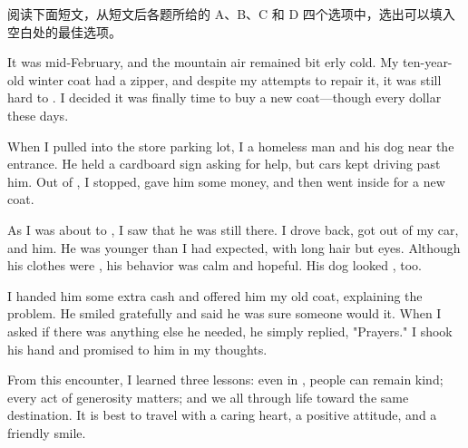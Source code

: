 \documentclass{英语试卷}
\begin{document}
\par 阅读下面短文，从短文后各题所给的 A、B、C 和 D 四个选项中，选出可以填入空白处的最佳选项。\par
\par It was mid-February, and the mountain air remained bit erly cold. My ten-year-old winter coat had a  zipper, and despite my attempts to repair it, it was still hard to . I decided it was finally time to buy a new coat—though every dollar  these days.\par
\par When I pulled into the store parking lot, I  a homeless man and his dog near the entrance. He held a cardboard sign asking for help, but cars kept driving past him. Out of , I stopped, gave him some money, and then went inside for a new coat.\par
\par As I was about to , I saw that he was still there. I drove back, got out of my car, and  him. He was younger than I had expected, with long hair but  eyes. Although his clothes were , his behavior was calm and hopeful. His dog looked , too.\par
\par I handed him some extra cash and offered him my old coat, explaining the  problem. He smiled gratefully and said he was sure someone would  it. When I asked if there was anything else he needed, he simply replied, "Prayers." I shook his hand and promised to  him in my thoughts.\par
\par From this encounter, I learned three lessons: even in , people can remain kind; every act of generosity matters; and we all  through life toward the same destination. It is best to travel with a caring heart, a positive attitude, and a friendly smile.\par
{}
\end{document}
